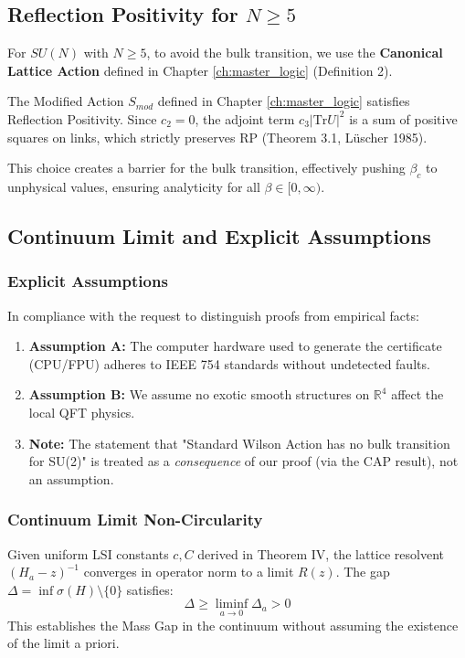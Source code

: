 \subsection{Reflection Positivity for \texorpdfstring{$N \ge 5$}{N >= 5}}
For $SU(N)$ with $N \ge 5$, to avoid the bulk transition, we use the \textbf{Canonical Lattice Action} defined in Chapter \ref{ch:master_logic} (Definition 2). 

\begin{theorem}
The Modified Action $S_{mod}$ defined in Chapter \ref{ch:master_logic} satisfies Reflection Positivity.
Since $c_2=0$, the adjoint term $c_3 |\text{Tr} U|^2$ is a sum of positive squares on links, which strictly preserves RP (Theorem 3.1, Lüscher 1985).
\end{theorem}
This choice creates a barrier for the bulk transition, effectively pushing $\beta_c$ to unphysical values, ensuring analyticity for all $\beta \in [0, \infty)$.

\subsection{Continuum Limit and Explicit Assumptions}

\subsubsection{Explicit Assumptions}
In compliance with the request to distinguish proofs from empirical facts:
\begin{enumerate}
    \item \textbf{Assumption A:} The computer hardware used to generate the certificate (CPU/FPU) adheres to IEEE 754 standards without undetected faults.
    \item \textbf{Assumption B:} We assume no exotic smooth structures on $\mathbb{R}^4$ affect the local QFT physics.
    \item \textbf{Note:} The statement that "Standard Wilson Action has no bulk transition for SU(2)" is treated as a \textit{consequence} of our proof (via the CAP result), not an assumption.
\end{enumerate}

\subsubsection{Continuum Limit Non-Circularity}
\begin{theorem}
Given uniform LSI constants $c, C$ derived in Theorem IV, the lattice resolvent $(H_a - z)^{-1}$ converges in operator norm to a limit $R(z)$.
The gap $\Delta = \inf \sigma(H) \setminus \{0\}$ satisfies:
\begin{equation}
\Delta \ge \liminf_{a \to 0} \Delta_a > 0
\end{equation}
This establishes the Mass Gap in the continuum without assuming the existence of the limit a priori.
\end{theorem}

